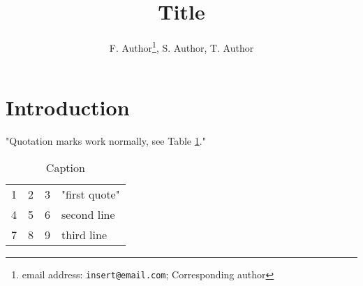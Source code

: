 \documentclass[12pt, letterpaper]{article}
\title{Title}
\author{F. Author\thanks{email address: \texttt{insert@email.com}; Corresponding author}, S. Author, T. Author}
\date{}
\newcommand{\beginsupplement}{%
        \setcounter{table}{0}
        \renewcommand{\thetable}{S\arabic{table}}%
        \setcounter{figure}{0}
        \renewcommand{\thefigure}{S\arabic{figure}}%
     }
\begin{document}
\maketitle

\begin{abstract}
    \noindent \lipsum[1]
\end{abstract}

\section{Introduction}

\lipsum[2]

"Quotation marks work normally, see Table \ref{tab:example}."


\begin{table}[h]
    \centering
    \caption{Caption}
    \begin{tabular}{ l | c | r | p{3cm}}
        \hline			
        1 & 2 & 3 & "first quote" \\
        4 & 5 & 6 & second line \\
        7 & 8 & 9 & third line \\
        \hline  
    \end{tabular}
    \label{tab:example}
\end{table}


\iffalse

\begin{figure}
    \centering
    \texttt{[image: ]}
    \caption{Caption}
    \label{fig:example}
\end{figure}

\fi

\printbibliography

\beginsupplement

\end{document}
